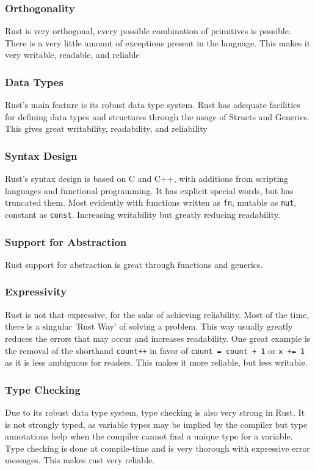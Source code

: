 \documentclass{article}
\newcommand{\rustin}[1]{\texttt{#1}}
\begin{document}
  \subsubsection{Orthogonality}
  Rust is very orthogonal, every possible combination of primitives is possible.
  There is a very little amount of exceptions present in the language. This
  makes it very writable, readable, and reliable

  \subsubsection{Data Types}
  Rust's main feature is its robust data type system. Rust has adequate
  facilities for defining data types and structures through the usage of Structs
  and Generics. This gives great writability, readability, and reliability

  \subsubsection{Syntax Design}
  Rust's syntax design is based on C and C++, with additions from scripting
  languages and functional programming. It has explicit special words, but has
  truncated them. Most evidently with functions written as \rustin{fn}, mutable
  as \rustin{mut}, constant as \rustin{const}. Increasing writability but
  greatly reducing readability.

  \subsubsection{Support for Abstraction}
  Rust support for abstraction is great through functions and generics.

  \subsubsection{Expressivity}
  Rust is not that expressive, for the sake of achieving reliability. Most of
  the time, there is a singular 'Rust Way' of solving a problem. This way
  usually greatly reduces the errors that may occur and increases readability.
  One great example is the removal of the shorthand \texttt{count++} in
  favor of \rustin{count = count + 1} or \rustin{x += 1} as it is less ambiguous
  for readers. This makes it more reliable, but less writable.


  \subsubsection{Type Checking}
  Due to its robust data type system, type checking is also very strong in Rust.
  It is not strongly typed, as variable types may be implied by the compiler but
  type annotations help when the compiler cannot find a unique type for a
  variable. Type checking is done at compile-time and is very thorough with
  expressive error messages. This makes rust very reliable.
\end{document}
